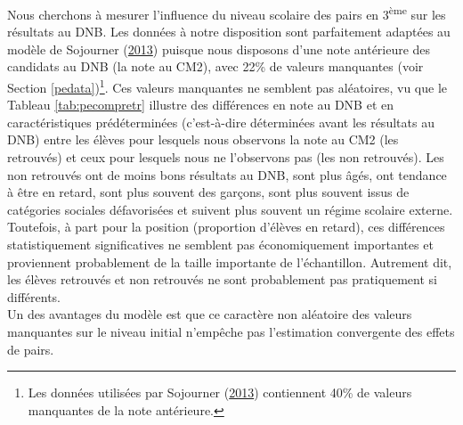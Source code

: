 \documentclass[
]{book}
\begin{document}
Nous cherchons à mesurer l'influence du niveau scolaire des pairs en 3\textsuperscript{ème} sur les résultats au DNB. Les données à notre disposition sont parfaitement adaptées au modèle de Sojourner (\protect\hyperlink{ref-SOJ:13}{2013}) puisque nous disposons d'une note antérieure des candidats au DNB (la note au CM2), avec 22\% de valeurs manquantes (voir Section \ref{pedata})\footnote{Les données utilisées par Sojourner (\protect\hyperlink{ref-SOJ:13}{2013}) contiennent 40\% de valeurs manquantes de la note antérieure.}. Ces valeurs manquantes ne semblent pas aléatoires, vu que le Tableau \ref{tab:pecompretr} illustre des différences en note au DNB et en caractéristiques prédéterminées (c'est-à-dire déterminées avant les résultats au DNB) entre les élèves pour lesquels nous observons la note au CM2 (les retrouvés) et ceux pour lesquels nous ne l'observons pas (les non retrouvés). Les non retrouvés ont de moins bons résultats au DNB, sont plus âgés, ont tendance à être en retard, sont plus souvent des garçons, sont plus souvent issus de catégories sociales défavorisées et suivent plus souvent un régime scolaire externe. Toutefois, à part pour la position (proportion d'élèves en retard), ces différences statistiquement significatives ne semblent pas économiquement importantes et proviennent probablement de la taille importante de l'échantillon. Autrement dit, les élèves retrouvés et non retrouvés ne sont probablement pas pratiquement si différents.\\
Un des avantages du modèle est que ce caractère non aléatoire des valeurs manquantes sur le niveau initial n'empêche pas l'estimation convergente des effets de pairs.

\begingroup\fontsize{8}{10}\selectfont
\end{document}
